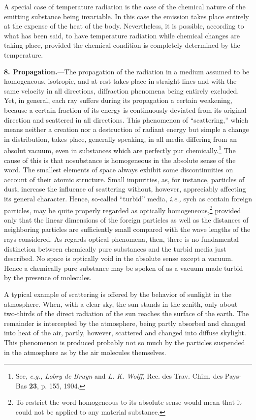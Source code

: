 \documentclass[12pt,oneside]{book}
\begin{document}
A special case of temperature radiation is the case of the chemical nature of the emitting substance being invariable. In this case the emission takes place entirely at the expense of the heat of the body. Nevertheless, it is possible, according to what has been said, to have temperature radiation while chemical changes are taking place, provided the chemical condition is completely determined by the temperature. \par 

\textbf{8. Propagation.}---The propagation of the radiation in a medium assumed to be homogeneous, isotropic, and at rest takes place in straight lines and with the same velocity in all directions, diffraction phenomena being entirely excluded. Yet, in general, each ray suffers during its propagation a certain weakening, because a certain fraction of its energy is continuously deviated from its original direction and scattered in all directions. This phenomenon of ``scattering,'' which means neither a creation nor a destruction of radiant energy but simple a change in distribution, takes place, generally speaking, in all media differing from an absolut vacuum, even in substances which are perfectly pur chemically.\footnote{See, \textit{e.g., Lobry de Bruyn} and \textit{L. K. Wolff}, Rec. des Trav. Chim. des Pays-Bas \textbf{23}, p. 155, 1904.} The cause of this is that nosubstance is homogeneous in the absolute sense of the word. The smallest elements of space always exhibit some discontinuities on account of their atomic structure. Small impurities, as, for instance, particles of dust, increase the influence of scattering without, however, appreciably affecting its general character. Hence, so-called ``turbid'' media, \textit{i.e.,} sych as contain foreign particles, may be quite properly regarded as optically homogeneous,\footnote{To restrict the word homogeneous to its absolute sense would mean that it could not be applied to any material substance.} provided only that the linear dimensions of the foreign particles as well as the distances of neighboring particles are sufficiently small compared with the wave lengths of the rays considered. As regards optical phenomena, then, there is no fundamental distinction between chemically pure substances and the turbid media just described. No space is optically void in the absolute sense except a vacuum. Hence a chemically pure substance may be spoken of as a vacuum made turbid by the presence of molecules. \par 

A typical example of scattering is offered by the behavior of sunlight in the atmosphere. When, with a clear sky, the sun stands in the zenith, only about two-thirds of the direct radiation of the sun reaches the surface of the earth. The remainder is intercepted by the atmosphere, being partly absorbed and changed into heat of the air, partly, however, scattered and changed into diffuse skylight. This phenomenon is produced probably not so much by the particles suspended in the atmosphere as by the air molecules themselves. \par 
\end{document}
